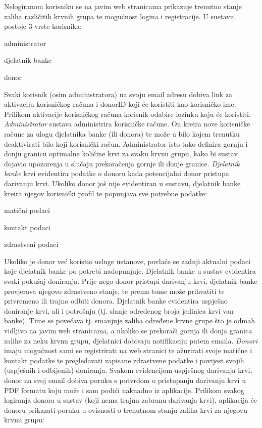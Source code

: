 		Nelogiranom korisniku se na javim web stranicama prikazuje trenutno stanje zaliha različitih krvnih grupa te mogućnost logina i registracije. U sustavu postoje 3 vrste korisnika:
		\begin{packed_item}
			\item{administrator}
			\item{djelatnik banke}
			\item{donor}
		\end{packed_item}
		Svaki korisnik (osim administratora) na svoju email adresu dobiva link za aktivaciju korisničkog računa i donorID koji će koristiti kao korisničko ime. Prilikom aktivacije korisničkog računa korisnik odabire lozinku koju će koristiti.
		\underbar \textit{Administrator} sustava administrira korisničke račune. On kreira nove korisničke račune za ulogu djelatnika banke (ili donora) te može u bilo kojem trenutku deaktivirati bilo koji korisnički račun. Administrator isto tako definira gornju i donju granicu optimalne količine krvi za svaku krvnu grupu, kako bi sustav dojavio upozorenja u slučaju prekoračenja gornje ili donje granice.
		\underbar \textit{Djelatnik banke} krvi evidentira podatke o donoru kada potencijalni donor pristupa darivanju krvi. Ukoliko donor još nije evidentiran u sustavu, djelatnik banke kreira njegov korisnički profil te popunjava sve potrebne podatke:
		\begin{packed_item}
			\item{matični podaci}
			\item{kontakt podaci}
			\item{zdrastveni podaci}
		\end{packed_item}
		Ukoliko je donor već koristio usluge ustanove, povlače se zadnji aktualni podaci koje djelatnik banke po potrebi nadopunjuje. Djelatnik banke u sustav evidentira svaki pokušaj doniranja. Prije nego donor pristupi darivanju krvi, djelatnik banke provjerava njegovo zdrastveno stanje, te prema tome može prihvatiti te privremeno ili trajno odbiti donora.
		Djelatnik banke evidentira uspješno doniranje krvi, ali i potrošnju (tj. slanje određenog broja jedinica krvi van banke). Time se povećava tj. smanjuje zaliha određene krvne grupe što je odmah vidljivo na javim web stranicama, a ukoliko se prekorači gornja ili donja granica zalihe za neku krvnu grupu, djelatnici dobivaju notifikaciju putem emaila.
		\underbar \textit{Donori} imaju mogućnost sami se registrirati na web stranici te ažurirati svoje matične i kontakt podatke te pregledavati zapisane zdrastvene podatke i povijest svojih (uspješnih i odbijenih) doniranja. Svakom evidencijom uspješnog darivanja krvi, donor na svoj email dobiva poruku s potvrdom o pristupanju darivanju krvi u PDF formatu koju može i sam podići naknadno iz aplikacije. Prilikom svakog logiranja donora u sustav (koji nema trajnu zabranu darivanja krvi), aplikacija će donoru prikazati poruku u ovisnosti o trenutnom stanju zaliha krvi za njegovu krvnu grupu:
